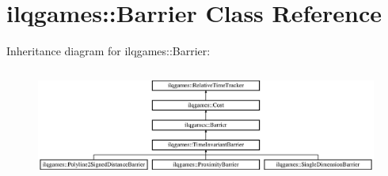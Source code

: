 \hypertarget{classilqgames_1_1_barrier}{}\section{ilqgames\+:\+:Barrier Class Reference}
\label{classilqgames_1_1_barrier}
Inheritance diagram for ilqgames\+:\+:Barrier\+:\begin{figure}[H]
\begin{center}
\leavevmode
\includegraphics[height=3.674541cm]{classilqgames_1_1_barrier}
\end{center}
\end{figure}
